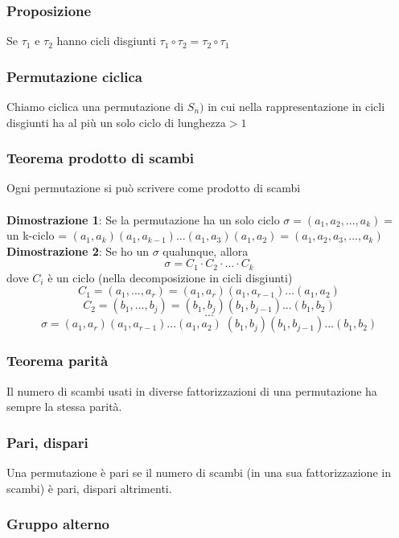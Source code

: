 \subsubsection{Proposizione}
Se \(\tau _1\) e \(\tau _2\) hanno cicli disgiunti \(\tau _1\circ\tau _2 = \tau _2\circ\tau _1\)

\subsubsection{Permutazione ciclica}
Chiamo ciclica una permutazione di \(S_n)\) in cui nella rappresentazione in cicli disgiunti ha al più un solo ciclo di lunghezza\(>1\)

\subsubsection{Teorema prodotto di scambi}
Ogni permutazione si può scrivere come prodotto di scambi
\\\\
\textbf{Dimostrazione 1}: Se la permutazione ha un solo ciclo \(\sigma =(a_1, a_2, ... , a_k)=\) un k-ciclo = \((a_1,a_k)(a_1,a_{k-1})...(a_1,a_3)(a_1,a_2)=(a_1,a_2,a_3,...,a_k)\)
\\
\textbf{Dimostrazione 2}: Se ho un \(\sigma\) qualunque, allora
\[\sigma=C_1\cdot C_2\cdot ... \cdot C_k\]
dove \(C_i\) è un ciclo (nella decomposizione in cicli disgiunti)
\[C_1=(a_1,...,a_r)=(a_1,a_r)(a_1,a_{r-1})...(a_1,a_2)\]
\[C_2=(b_1,...,b_j)=(b_1,b_j)(b_1,b_{j-1})...(b_1,b_2)\]
\[. . .\]
\[\sigma =(a_1,a_r)(a_1,a_{r-1})...(a_1,a_2)\;(b_1,b_j)(b_1,b_{j-1})...(b_1,b_2) \]

\subsubsection{Teorema parità}
Il numero di scambi usati in diverse fattorizzazioni di una permutazione ha sempre la stessa parità.

\subsubsection{Pari, dispari}
Una permutazione è pari se il numero di scambi (in una sua fattorizzazione in scambi) è pari, dispari altrimenti.

\subsubsection{Gruppo alterno}

